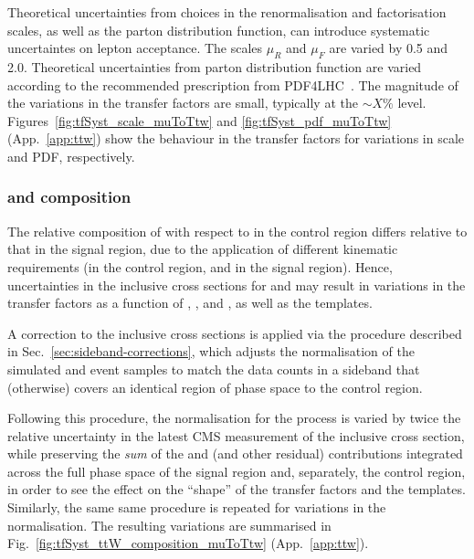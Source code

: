 Theoretical uncertainties from choices in the renormalisation and
factorisation scales, as well as the parton distribution function, can
introduce systematic uncertaintes on lepton acceptance. The scales
$\mu_R$ and $\mu_F$ are varied by 0.5 and 2.0. Theoretical
uncertainties from parton distribution function are varied according
to the recommended prescription from PDF4LHC~\cite{PDF4LHC:2015}. The
magnitude of the variations in the transfer factors are small,
typically at the $\sim X\%$
level. Figures~\ref{fig:tfSyst_scale_muToTtw} and
\ref{fig:tfSyst_pdf_muToTtw} (App.~\ref{app:ttw}) show the behaviour
in the transfer factors for variations in scale and PDF, respectively.

\subsubsection{\texorpdfstring{\wj}{W+jets} and \texorpdfstring{\ttbar}{TTbar} composition}
\label{sec:tfSyst_ttW_composition}

The relative composition of \wj with respect to \ttbar in the \mj
control region differs relative to that in the signal region, due to
the application of different kinematic requirements (\eg \mt in the
control region, \alphat and \bdphi in the signal region). Hence,
uncertainties in the inclusive cross sections for \wj and \ttbar may
result in variations in the transfer factors as a function of \njet,
\scalht, and \nb, as well as the \HTmiss templates.

A correction to the inclusive cross sections is applied via the
procedure described in Sec.~\ref{sec:sideband-corrections}, which
adjusts the normalisation of the simulated \wj and \ttbar event
samples to match the data counts in a \HTmiss sideband that
(otherwise) covers an identical region of phase space to the \mj
control region.

Following this procedure, the normalisation for the \wj process is
varied by twice the relative uncertainty in the latest CMS measurement
of the inclusive cross section, while preserving the {\it sum} of the
\wj and \ttbar (and other residual) contributions integrated across
the full phase space of the signal region and, separately, the \mj
control region, in order to see the effect on the ``shape'' of the
transfer factors and the \HTmiss templates. Similarly, the same same
procedure is repeated for variations in the \ttbar normalisation. The
resulting variations are summarised in
Fig.~\ref{fig:tfSyst_ttW_composition_muToTtw} (App.~\ref{app:ttw}).

